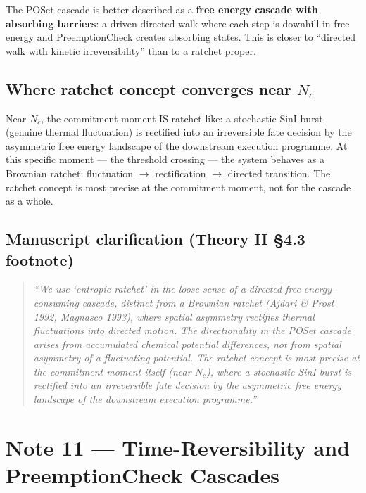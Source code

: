 \documentclass[11pt,a4paper]{article}
\begin{document}
The POSet cascade is better described as a
\textbf{free energy cascade with absorbing barriers}: a driven directed
walk where each step is downhill in free energy and PreemptionCheck
creates absorbing states.
This is closer to ``directed walk with kinetic irreversibility'' than
to a ratchet proper.

\subsection*{Where ratchet concept converges near $N_c$}

Near $N_c$, the commitment moment IS ratchet-like: a stochastic SinI
burst (genuine thermal fluctuation) is rectified into an irreversible
fate decision by the asymmetric free energy landscape of the downstream
execution programme.
At this specific moment --- the threshold crossing --- the system
behaves as a Brownian ratchet: fluctuation $\to$ rectification $\to$
directed transition.
The ratchet concept is most precise at the commitment moment, not for
the cascade as a whole.

\subsection*{Manuscript clarification (Theory II \S4.3 footnote)}

\begin{quote}
\emph{``We use `entropic ratchet' in the loose sense of a directed
free-energy-consuming cascade, distinct from a Brownian ratchet
(Ajdari \& Prost 1992, Magnasco 1993), where spatial asymmetry
rectifies thermal fluctuations into directed motion.
The directionality in the POSet cascade arises from accumulated
chemical potential differences, not from spatial asymmetry of a
fluctuating potential.
The ratchet concept is most precise at the commitment moment itself
(near $N_c$), where a stochastic SinI burst is rectified into an
irreversible fate decision by the asymmetric free energy landscape
of the downstream execution programme.''}
\end{quote}

\section*{Note 11 — Time-Reversibility and PreemptionCheck Cascades}
\end{document}
